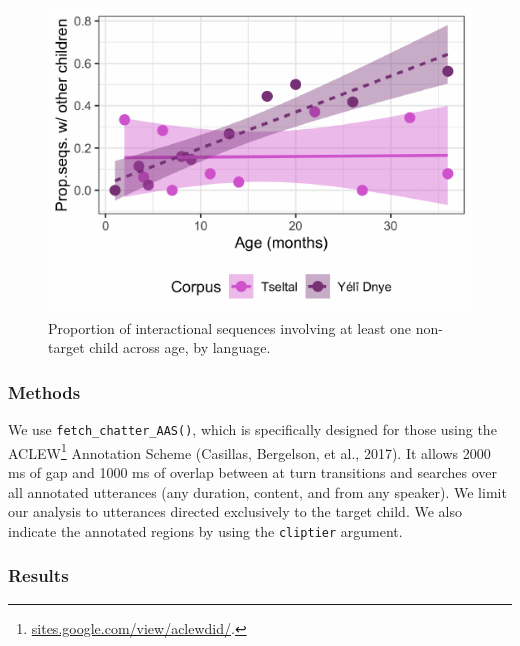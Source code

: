 \documentclass[10pt, letterpaper]{article}
\newenvironment{CodeChunk}{}{}
\begin{document}
\begin{CodeChunk}
\begin{figure}[h!]

{\centering \includegraphics{figs/tseyel.is.fig-1} 

}

\caption[Proportion of interactional sequences involving at least one non-target child across age, by language]{Proportion of interactional sequences involving at least one non-target child across age, by language.}\label{fig:tseyel.is.fig}
\end{figure}
\end{CodeChunk}

\hypertarget{methods}{%
\subsubsection{Methods}\label{methods}}

We use \texttt{fetch\_chatter\_AAS()}, which is specifically designed
for those using the ACLEW\footnote{\href{https://sites.google.com/view/aclewdid/home}{sites.google.com/view/aclewdid/}.}
Annotation Scheme (Casillas, Bergelson, et al., 2017). It allows 2000 ms
of gap and 1000 ms of overlap between at turn transitions and searches
over all annotated utterances (any duration, content, and from any
speaker). We limit our analysis to utterances directed exclusively to
the target child. We also indicate the annotated regions by using the
\texttt{cliptier} argument.

\hypertarget{results}{%
\subsubsection{Results}\label{results}}
\end{document}

